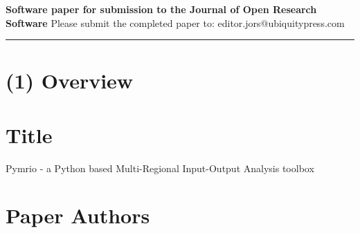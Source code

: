 \documentclass{jors}
\begin{document}
{\bf Software paper for submission to the Journal of Open Research Software} 
Please submit the completed paper to: editor.jors@ubiquitypress.com

\rule{\textwidth}{1pt}

\section*{(1) Overview}

\vspace{0.5cm}

\section*{Title}

Pymrio - a Python based Multi-Regional Input-Output Analysis toolbox

\section*{Paper Authors}
\end{document}
